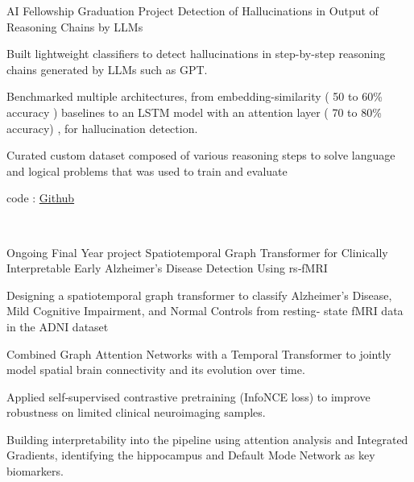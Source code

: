 \begin{cventries}
    \cventry
    {AI Fellowship Graduation Project}
    {Detection of Hallucinations in Output of Reasoning Chains by LLMs }
    {}
    {}
    {
      \begin{cvitems}
        \item {Built lightweight classifiers to detect hallucinations in step-by-step reasoning chains generated by LLMs such as GPT.}
        \item {Benchmarked multiple architectures, from embedding-similarity ( 50 to 60\% accuracy  ) baselines to an LSTM model with an attention layer ( 70 to 80\% accuracy) , for hallucination detection.}
        \item {Curated custom dataset composed of various reasoning steps to solve language and logical problems that was used to train and evaluate}
        \item {code : \href{https://github.com/Ishwor-git/Detection-of-Hallucinations-in-Reasoning-Chains-by-LLMs}{Github}}
      \end{cvitems}
      ‎ 
    }
  \cventry
    {Ongoing Final Year project}
    {Spatiotemporal Graph Transformer for Clinically Interpretable Early Alzheimer’s Disease
Detection Using rs‑fMRI}
    {}
    {}
    {
      \begin{cvitems}
        \item {Designing a spatiotemporal graph transformer to classify Alzheimer’s Disease, Mild Cognitive Impairment, and Normal Controls from resting‑
state fMRI data in the ADNI dataset}
        \item {Combined Graph Attention Networks with a Temporal Transformer to jointly model spatial brain connectivity and its evolution over time.}
        \item {Applied self‑supervised contrastive pretraining (InfoNCE loss) to improve robustness on limited clinical neuroimaging samples.}
        \item {Building interpretability into the pipeline using attention analysis and Integrated Gradients, identifying the hippocampus and Default Mode Network
as key biomarkers.}
      \end{cvitems}
      ‎ 
    }
    

    


\end{cventries}
